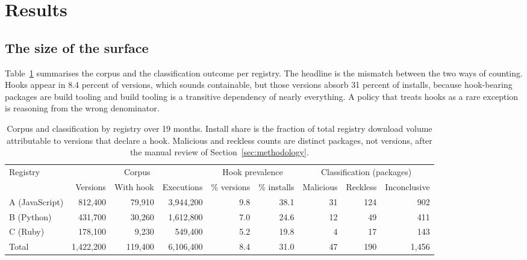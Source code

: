 \section{Results}
\label{sec:results}

\subsection{The size of the surface}

Table~\ref{tab:corpus} summarises the corpus and the classification outcome per
registry. The headline is the mismatch between the two ways of counting. Hooks
appear in 8.4 percent of versions, which sounds containable, but those versions
absorb 31 percent of installs, because hook-bearing packages are build tooling
and build tooling is a transitive dependency of nearly everything. A policy
that treats hooks as a rare exception is reasoning from the wrong denominator.

\begin{table}[t]
  \centering
  \footnotesize
  \caption{Corpus and classification by registry over 19 months. Install share
  is the fraction of total registry download volume attributable to versions
  that declare a hook. Malicious and reckless counts are distinct packages, not
  versions, after the manual review of Section~\ref{sec:methodology}.}
  \label{tab:corpus}
  \begin{tabular}{l rrr rr rrr}
    \toprule
    \multirow{2}{*}{Registry}
      & \multicolumn{3}{c}{Corpus}
      & \multicolumn{2}{c}{Hook prevalence}
      & \multicolumn{3}{c}{Classification (packages)} \\
    \cmidrule(lr){2-4} \cmidrule(lr){5-6} \cmidrule(lr){7-9}
      & Versions & With hook & Executions
      & \% versions & \% installs
      & Malicious & Reckless & Inconclusive \\
    \midrule
    A (JavaScript) & 812{,}400 & 79{,}910 & 3{,}944{,}200 & 9.8 & 38.1
                   & 31 & 124 & 902 \\
    B (Python)     & 431{,}700 & 30{,}260 & 1{,}612{,}800 & 7.0 & 24.6
                   & 12 &  49 & 411 \\
    C (Ruby)       & 178{,}100 &  9{,}230 &   549{,}400 & 5.2 & 19.8
                   &  4 &  17 & 143 \\
    \midrule
    Total          & 1{,}422{,}200 & 119{,}400 & 6{,}106{,}400 & 8.4 & 31.0
                   & 47 & 190 & 1{,}456 \\
    \bottomrule
  \end{tabular}
\end{table}

